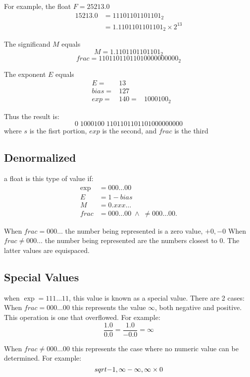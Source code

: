 \documentclass[12pt]{book}
\begin{document}
For example, the float $F=25213.0$\\
\begin{align*}
        15213.0 &=11101101101101_2\\
                &=1.1101101101101_2 \times 2^{13}
\end{align*}

\pagebreak

The significand $M$ equals \\
\[M=1.1101101101101_2\]
\[frac=11011011011010000000000_2\]

The exponent $E$ equals\\
\begin{align*}
        &E= &13\\
        &bias=  &127\\
        &exp=   &140 = &1000100_2
\end{align*}

Thus the result is:
\[0\;1000100\;1101101101101000000000\]
where $s$ is the fisrt portion, $exp$ is the second, and $frac$ is the third


\subsection*{Denormalized}
a float is this type of value if:
\begin{align*}
        \exp&= 000\ldots 00\\
        E&=1-bias\\
        M&=0.x x x \ldots\\
        frac&=000\ldots 00\;\wedge\;\neq 000\ldots 00
.\end{align*}   

When $frac = 000\ldots$ the number being represented is a zero value, $+0, -0$
When  $frac\neq 000\ldots$ the number being represented are the numbers closest to  $0$.
The latter values are equispaced.

\subsection*{Special Values}

when $\exp = 111\ldots 11$, this value is known as a special value. 
There are 2 cases:\\
When $frac = 000\ldots 00$ this represents the value $\infty$, both negative and positive. 
This operation is one that overflowed.
For example:
\[\frac{1.0}{0.0}=\frac{1.0}{-0.0}=\infty\]

When $frac \neq 000\ldots 00$ this represents the case where no numeric value can be determined.
For example:
\[\\sqrt{-1}, \infty - \infty, \infty\times 0 \]
\end{document}
